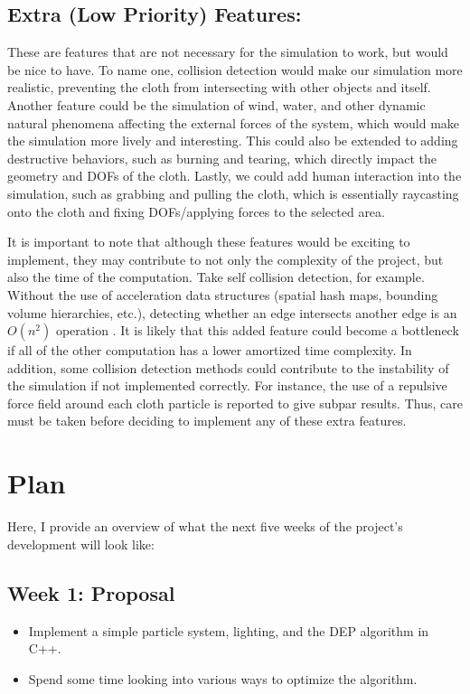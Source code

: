 \documentclass[letterpaper, 10 pt, conference, english]{ieeeconf}  %
\begin{document}
                \subsection*{Extra (Low Priority) Features:}
                These are features that are not necessary for the simulation to work, but would be nice to have. To name one, collision detection would make our simulation more realistic, preventing the cloth from intersecting with other objects and itself\cite{baraff1998large}. Another feature could be the simulation of wind, water, and other dynamic natural phenomena affecting the external forces of the system, which would make the simulation more lively and interesting. This could also be extended to adding destructive behaviors, such as burning and tearing, which directly impact the geometry and DOFs of the cloth. Lastly, we could add human interaction into the simulation, such as grabbing and pulling the cloth, which is essentially raycasting onto the cloth and fixing DOFs/applying forces to the selected area.
                
                It is important to note that although these features would be exciting to implement, they may contribute to not only the complexity of the project, but also the time of the computation. Take self collision detection, for example. Without the use of acceleration data structures (spatial hash maps, bounding volume hierarchies, etc.), detecting whether an edge intersects another edge is an $O(n^2)$ operation \cite{baraff1998large}. It is likely that this added feature could become a bottleneck if all of the other computation has a lower amortized time complexity. In addition, some collision detection methods could contribute to the instability of the simulation if not implemented correctly. For instance, the use of a repulsive force field around each cloth particle is reported to give subpar results\cite{Fisher}.  Thus, care must be taken before deciding to implement any of these extra features.
                
\section{Plan}
Here, I provide an overview of what the next five weeks of the project's development will look like:
        \subsection*{Week 1: Proposal}
                \begin{itemize}
                        \item Implement a simple particle system, lighting, and the DEP algorithm in C++.
                        \item Spend some time looking into various ways to optimize the algorithm.
                \end{itemize}
\end{document}
